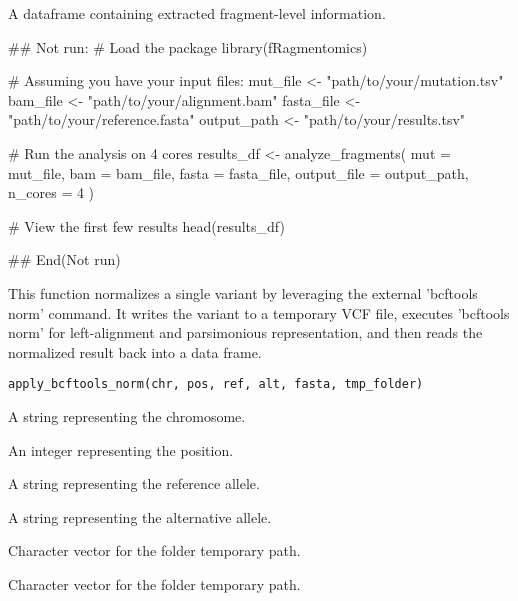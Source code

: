 \documentclass[a4paper]{book}
\begin{document}
%
\begin{Value}
A dataframe containing extracted fragment-level information.
\end{Value}
%
\begin{Examples}
\begin{ExampleCode}
## Not run: 
# Load the package
library(fRagmentomics)

# Assuming you have your input files:
mut_file <- "path/to/your/mutation.tsv"
bam_file <- "path/to/your/alignment.bam"
fasta_file <- "path/to/your/reference.fasta"
output_path <- "path/to/your/results.tsv"

# Run the analysis on 4 cores
results_df <- analyze_fragments(
  mut = mut_file,
  bam = bam_file,
  fasta = fasta_file,
  output_file = output_path,
  n_cores = 4
)

# View the first few results
head(results_df)

## End(Not run)
\end{ExampleCode}
\end{Examples}
%
\begin{Description}
This function normalizes a single variant by leveraging the external 'bcftools norm' command. It writes
the variant to a temporary VCF file, executes 'bcftools norm' for left-alignment and parsimonious representation,
and then reads the normalized result back into a data frame.
\end{Description}
%
\begin{Usage}
\begin{verbatim}
apply_bcftools_norm(chr, pos, ref, alt, fasta, tmp_folder)
\end{verbatim}
\end{Usage}
%
\begin{Arguments}
\begin{ldescription}
\item[\code{chr}] A string representing the chromosome.

\item[\code{pos}] An integer representing the position.

\item[\code{ref}] A string representing the reference allele.

\item[\code{alt}] A string representing the alternative allele.

\item[\code{fasta}] Character vector for the folder temporary path.

\item[\code{tmp\_folder}] Character vector for the folder temporary path.
\end{ldescription}
\end{Arguments}
\end{document}
